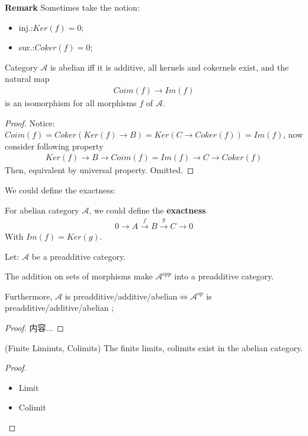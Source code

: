 \documentclass[Total.tex]{subfiles}
\begin{document}
			\textbf{Remark} Sometimes take the notion:
			\begin{itemize}
				\item inj.:$Ker(f)=0$;
				\item sur.:$Coker(f)=0$;
			\end{itemize}
			
			\begin{proposition}
				Category $\mathcal{A}$ is abelian iff it is additive,  all kernels and cokernels exist, and the natural map
				\begin{gather*}
					Coim(f)\rightarrow Im(f)
				\end{gather*}
				is an isomorphism for all morphisms $f$ of $\mathcal{A}$.
			\end{proposition}
			\begin{proof}
				Notice: $Coim(f)=Coker(Ker(f)\rightarrow B)=Ker(C\rightarrow Coker(f))=Im(f)$, now consider following property
				\begin{gather*}
					Ker(f)\rightarrow B\rightarrow Coim(f)=Im(f)\rightarrow C\rightarrow Coker(f)
				\end{gather*}
				Then, equivalent by universal property. Omitted.
			\end{proof}
			
			We could define the exactness:
			\begin{Def}
				For abelian category $\mathcal{A}$, we could define the \textbf{exactness}
				\begin{gather*}
					0\rightarrow A\stackrel{f}{\rightarrow} B\stackrel{g}{\rightarrow} C\rightarrow 0
				\end{gather*}
				With $Im(f)=Ker(g)$.
			\end{Def}
			
			\begin{lemma}
				Let: $\mathcal{A}$ be a preadditive category.
				
				The addition on sets of morphisms make $\mathcal{A}^{opp}$ into a preadditive category.
				
				Furthermore, $\mathcal{A}$ is preadditive/additive/abelian$\Leftrightarrow \mathcal{A}^{op}$ is preadditive/additive/abelian	;
			\end{lemma}
			\begin{proof}
				内容...
			\end{proof}
			
			\begin{lemma}
				(Finite Limimts, Colimits) The finite limits, colimits exist in the abelian category.
			\end{lemma}
			\begin{proof}
				\begin{itemize}
					\item Limit
					\item Colimit
				\end{itemize}
			\end{proof}
			
\end{document}
